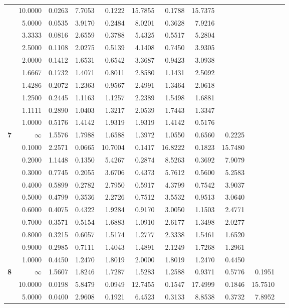 \begin{table}[!htb]
\begin{center}
{\begin{tabular}{|c||r|r|r|r|r|r|r|r|r|r|}
&10.0000&0.0263&7.7053&0.1222&15.7855&0.1788&15.7375&     &     &     \\
&5.0000&0.0535&3.9170&0.2484&8.0201&0.3628&7.9216&     &     &     \\
&3.3333&0.0816&2.6559&0.3788&5.4325&0.5517&5.2804&     &     &     \\
&2.5000&0.1108&2.0275&0.5139&4.1408&0.7450&3.9305&     &     &     \\
&2.0000&0.1412&1.6531&0.6542&3.3687&0.9423&3.0938&     &     &     \\
&1.6667&0.1732&1.4071&0.8011&2.8580&1.1431&2.5092&     &     &     \\
&1.4286&0.2072&1.2363&0.9567&2.4991&1.3464&2.0618&     &     &     \\
&1.2500&0.2445&1.1163&1.1257&2.2389&1.5498&1.6881&     &     &     \\
&1.1111&0.2890&1.0403&1.3217&2.0539&1.7443&1.3347&     &     &     \\
&1.0000&0.5176&1.4142&1.9319&1.9319&1.4142&0.5176&     &     &     \\ \hline
\textbf{ 7}&$\infty$&1.5576&1.7988&1.6588&1.3972&1.0550&0.6560&0.2225&     &     \\
&0.1000&2.2571&0.0665&10.7004&0.1417&16.8222&0.1823&15.7480&     &     \\
&0.2000&1.1448&0.1350&5.4267&0.2874&8.5263&0.3692&7.9079&     &     \\
&0.3000&0.7745&0.2055&3.6706&0.4373&5.7612&0.5600&5.2583&     &     \\
&0.4000&0.5899&0.2782&2.7950&0.5917&4.3799&0.7542&3.9037&     &     \\
&0.5000&0.4799&0.3536&2.2726&0.7512&3.5532&0.9513&3.0640&     &     \\
&0.6000&0.4075&0.4322&1.9284&0.9170&3.0050&1.1503&2.4771&     &     \\
&0.7000&0.3571&0.5154&1.6883&1.0910&2.6177&1.3498&2.0277&     &     \\
&0.8000&0.3215&0.6057&1.5174&1.2777&2.3338&1.5461&1.6520&     &     \\
&0.9000&0.2985&0.7111&1.4043&1.4891&2.1249&1.7268&1.2961&     &     \\
&1.0000&0.4450&1.2470&1.8019&2.0000&1.8019&1.2470&0.4450&     &     \\ \hline
\textbf{ 8}&$\infty$&1.5607&1.8246&1.7287&1.5283&1.2588&0.9371&0.5776&0.1951&     \\
&10.0000&0.0198&5.8479&0.0949&12.7455&0.1547&17.4999&0.1846&15.7510&     \\
&5.0000&0.0400&2.9608&0.1921&6.4523&0.3133&8.8538&0.3732&7.8952&     \\

\end{tabular}}
\end{center}
\end{table}

